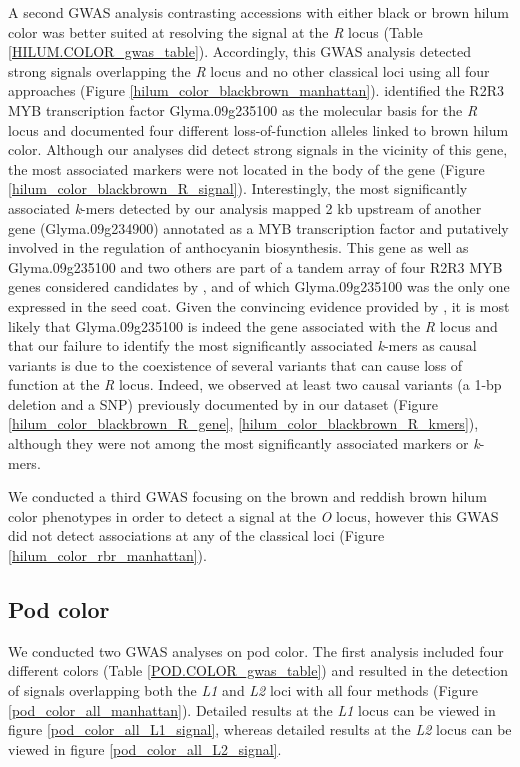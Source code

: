 A second GWAS analysis contrasting accessions with either black or brown hilum
color was better suited at resolving the signal at the \emph{R} locus (Table
\ref{HILUM.COLOR_gwas_table}). Accordingly, this GWAS analysis detected strong
signals overlapping the \emph{R} locus and no other classical loci using all
four approaches (Figure \ref{hilum_color_blackbrown_manhattan}).
\cite{gillman2011} identified the R2R3 MYB transcription factor Glyma.09g235100
as the molecular basis for the \emph{R} locus and documented four different
loss-of-function alleles linked to brown hilum color. Although our analyses did
detect strong signals in the vicinity of this gene, the most associated markers
were not located in the body of the gene (Figure
\ref{hilum_color_blackbrown_R_signal}). Interestingly, the most significantly
associated \emph{k}-mers detected by our analysis mapped 2 kb upstream of
another gene (Glyma.09g234900) annotated as a MYB transcription factor and
putatively involved in the regulation of anthocyanin biosynthesis. This gene
as well as Glyma.09g235100 and two others are part of a tandem array of four
R2R3 MYB genes considered candidates by \cite{gillman2011}, and of which
Glyma.09g235100 was the only one expressed in the seed coat. Given the
convincing evidence provided by \cite{gillman2011}, it is most likely that
Glyma.09g235100 is indeed the gene associated with the \emph{R} locus and that
our failure to identify the most significantly associated \emph{k}-mers as
causal variants is due to the coexistence of several variants that can cause
loss of function at the \emph{R} locus. Indeed, we observed at least two causal
variants (a 1-bp deletion and a SNP) previously documented by
\cite{gillman2011} in our dataset (Figure \ref{hilum_color_blackbrown_R_gene},
\ref{hilum_color_blackbrown_R_kmers}), although they were not among the most
significantly associated markers or \emph{k}-mers.

We conducted a third GWAS focusing on the brown and reddish brown hilum color
phenotypes in order to detect a signal at the \emph{O} locus, however this GWAS
did not detect associations at any of the classical loci (Figure
\ref{hilum_color_rbr_manhattan}).

\subsection*{Pod color}
\label{sv-gwas-pod-color}

We conducted two GWAS analyses on pod color. The first analysis included four
different colors (Table \ref{POD.COLOR_gwas_table}) and resulted in the
detection of signals overlapping both the \emph{L1} and \emph{L2} loci with all
four methods (Figure \ref{pod_color_all_manhattan}). Detailed results at the
\textit{L1} locus can be viewed in figure \ref{pod_color_all_L1_signal},
whereas detailed results at the \textit{L2} locus can be viewed in figure
\ref{pod_color_all_L2_signal}.

